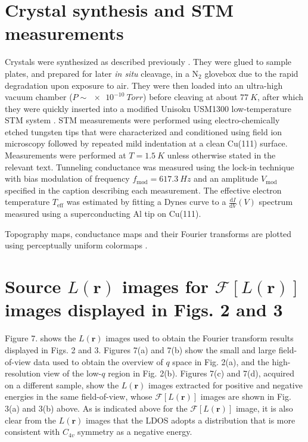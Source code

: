\documentclass[reprint,superscriptaddress,prb,aps]{revtex4-2}
\begin{document}
\appendix

\section{Crystal synthesis and STM measurements}

Crystals were synthesized as described previously \cite{Yamada2021}. They were glued to sample plates, and prepared for later \textit{in situ} cleavage, in a N$_{2}$ glovebox due to the rapid degradation upon exposure to air. They were then loaded into an ultra-high vacuum chamber ($P \sim \SI{e-10}{Torr}$) before cleaving at about $\SI{77}{K}$, after which they were quickly inserted into a modified Unisoku USM1300 low-temperature STM system \cite{Hanaguri2006}. STM measurements were performed using electro-chemically etched tungsten tips that were characterized and conditioned using field ion microscopy followed by repeated mild indentation at a clean Cu(111) surface. Measurements were performed at $T = \SI{1.5}{K}$ unless otherwise stated in the relevant text. Tunneling conductance was measured using the lock-in technique with bias modulation of frequency $f_{\textrm{mod}} = \SI{617.3}{Hz}$ and an amplitude $V_{\mathrm{mod}}$ specified in the caption describing each measurement. The effective electron temperature $T_{\mathrm{eff}}$ was estimated by fitting a Dynes curve to a $\frac{\mathrm{d}I}{\mathrm{d}V}(V)$ spectrum measured using a superconducting Al tip on Cu(111).

Topography maps, conductance maps and their Fourier transforms are plotted using perceptually uniform colormaps \cite{Thyng2016}.


\section{Source $L(\mathbf{r})$ images for $\mathcal{F} \left[ L(\mathbf{r}) \right]$ images displayed in Figs. 2 and 3}

Figure 7. shows the $L(\mathbf{r})$ images used to obtain the Fourier transform results displayed in Figs. 2 and 3. Figures 7(a) and 7(b) show the small and large field-of-view data used to obtain the overview of $q$ space in Fig. 2(a), and the high-resolution view of the low-$q$ region in Fig. 2(b). Figures 7(c) and 7(d), acquired on a different sample, show the $L(\mathbf{r})$ images extracted for positive and negative energies in the same field-of-view, whose $\mathcal{F} \left[ L(\mathbf{r}) \right]$ images are shown in Fig. 3(a) and 3(b) above. As is indicated above for the $\mathcal{F} \left[ L(\mathbf{r}) \right]$ image, it is also clear from the $L(\mathbf{r})$ images that the LDOS adopts a distribution that is more consistent with $C_{4v}$ symmetry as a negative energy.
\end{document}
